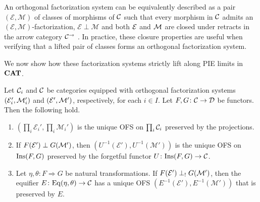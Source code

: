 \begin{remark}
   An orthogonal factorization system can be equivalently described as a pair $(\mathcal{E}, \mathcal{M})$ of classes of morphisms of $\mathcal{C}$ such that every morphism in $\mathcal{C}$ admits an $(\mathcal{E}, \mathcal{M})$-factorization, $\mathcal{E} \perp \mathcal{M}$ and both $\mathcal{E}$ and $\mathcal{M}$ are closed under retracts in the arrow category $\mathcal{C}^{\to}$ \cite[Lemma~11.2.3]{Riehl2014CategoricalHomotopyTheory}. In practice, these closure properties are useful when verifying that a lifted pair of classes forms an orthogonal factorization system.
\end{remark}

We now show how these factorization systems strictly lift along PIE limits in $\mathbf{CAT}$.

\begin{theorem}\label{thm:pie_ofs_creation}
   Let $\mathcal{C}_i$ and $\mathcal{C}$ be categories equipped with orthogonal factorization systems $(\mathcal{E}_i',\mathcal{M}_i')$ and $(\mathcal{E}',\mathcal{M}')$, respectively, for each $i\in I$. Let $F,G\colon \mathcal{C}\to \mathcal{D}$ be functors. Then the following hold.
   \begin{enumerate}
       \item $(\prod_i \mathcal{E}_i',\prod_i \mathcal{M}_i')$ is the unique OFS on $\prod_i \mathcal{C}_i$ preserved by the projections.
       \item If $F(\mathcal{E}')\perp G(\mathcal{M}')$, then $(U^{-1}(\mathcal{E}'),U^{-1}(\mathcal{M}'))$ is the unique OFS on $\mathrm{Ins}(F,G)$ preserved by the forgetful functor $U\colon \mathrm{Ins}(F,G)\to \mathcal{C}$.
       \item Let $\eta,\theta\colon F\Rightarrow G$ be natural transformations. If $F(\mathcal{E}')\perp_! G(\mathcal{M}')$, then the equifier $E\colon \mathrm{Eq}(\eta,\theta)\to \mathcal{C}$ has a unique OFS $(E^{-1}(\mathcal{E}'), E^{-1}(\mathcal{M}'))$ that is preserved by $E$. 
   \end{enumerate}
\end{theorem}
